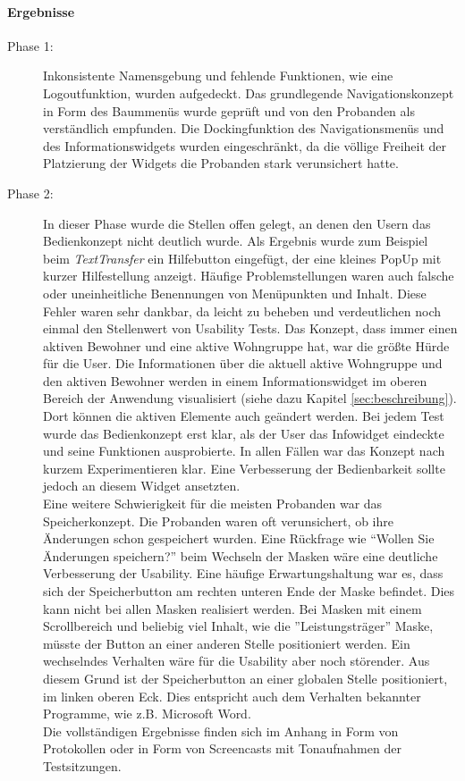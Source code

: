 \paragraph*{Ergebnisse}
\begin{description}

\item[Phase 1:] Inkonsistente Namensgebung und fehlende Funktionen, wie eine Logoutfunktion, wurden aufgedeckt. Das grundlegende Navigationskonzept in Form des Baummenüs wurde geprüft und von den Probanden als verständlich empfunden. Die Dockingfunktion des Navigationsmenüs und des Informationswidgets wurden eingeschränkt, da die völlige Freiheit der Platzierung der Widgets die Probanden stark verunsichert hatte. 

\item[Phase 2:] In dieser Phase wurde die Stellen offen gelegt, an denen den Usern das Bedienkonzept nicht deutlich wurde.
Als Ergebnis wurde zum Beispiel beim \textit{TextTransfer} ein Hilfebutton eingefügt, der eine kleines PopUp mit kurzer Hilfestellung anzeigt.
Häufige Problemstellungen waren auch falsche oder uneinheitliche Benennungen von Menüpunkten und Inhalt. Diese Fehler waren sehr dankbar, da leicht zu beheben und verdeutlichen noch einmal den Stellenwert von Usability Tests. Das Konzept, dass \EBP immer einen aktiven Bewohner und eine aktive Wohngruppe hat, war die größte Hürde für die User.
Die Informationen über die aktuell aktive Wohngruppe und den aktiven Bewohner werden in einem Informationswidget im oberen Bereich der Anwendung visualisiert (siehe dazu Kapitel \ref{sec:beschreibung}). Dort können die aktiven Elemente auch geändert werden. Bei jedem Test wurde das Bedienkonzept erst klar, als der User das Infowidget eindeckte und seine Funktionen  ausprobierte. In allen Fällen war das 
Konzept nach kurzem Experimentieren klar. Eine Verbesserung der Bedienbarkeit sollte jedoch an diesem Widget ansetzten.\\
Eine weitere Schwierigkeit für die meisten Probanden war das Speicherkonzept. Die Probanden waren oft verunsichert, ob ihre Änderungen schon
gespeichert wurden. Eine Rückfrage wie ``Wollen Sie Änderungen speichern?'' beim Wechseln der Masken wäre eine deutliche Verbesserung der Usability. 
Eine häufige Erwartungshaltung war es, dass sich der Speicherbutton am rechten unteren Ende der Maske befindet. Dies kann nicht bei allen Masken
realisiert werden. Bei Masken mit einem Scrollbereich und beliebig viel Inhalt, wie die ''Leistungsträger'' Maske, müsste der Button an einer anderen
Stelle positioniert werden. Ein wechselndes Verhalten wäre für die Usability aber noch störender. Aus diesem Grund ist der Speicherbutton an einer
globalen Stelle positioniert, im linken oberen Eck. Dies entspricht auch dem Verhalten bekannter Programme, wie z.B. Microsoft Word.\\
Die vollständigen Ergebnisse finden sich im Anhang in Form von Protokollen oder in Form von Screencasts mit Tonaufnahmen der Testsitzungen.

\end{description}


